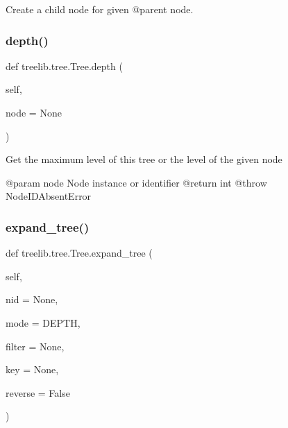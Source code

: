 \begin{DoxyVerb}Create a child node for given @parent node.\end{DoxyVerb}
 \mbox{\label{classtreelib_1_1tree_1_1Tree_a890a44d3244ac67247322719d9228163}} 
\subsubsection{\texorpdfstring{depth()}{depth()}}
{\footnotesize\ttfamily def treelib.\+tree.\+Tree.\+depth (\begin{DoxyParamCaption}\item[{}]{self,  }\item[{}]{node = {\ttfamily None} }\end{DoxyParamCaption})}

\begin{DoxyVerb}Get the maximum level of this tree or the level of the given node

@param node Node instance or identifier
@return int
@throw NodeIDAbsentError
\end{DoxyVerb}
 \mbox{\label{classtreelib_1_1tree_1_1Tree_ac6b3fbe0c1b1b6b906306b9925e3011a}} 
\subsubsection{\texorpdfstring{expand\+\_\+tree()}{expand\_tree()}}
{\footnotesize\ttfamily def treelib.\+tree.\+Tree.\+expand\+\_\+tree (\begin{DoxyParamCaption}\item[{}]{self,  }\item[{}]{nid = {\ttfamily None},  }\item[{}]{mode = {\ttfamily DEPTH},  }\item[{}]{filter = {\ttfamily None},  }\item[{}]{key = {\ttfamily None},  }\item[{}]{reverse = {\ttfamily False} }\end{DoxyParamCaption})}

